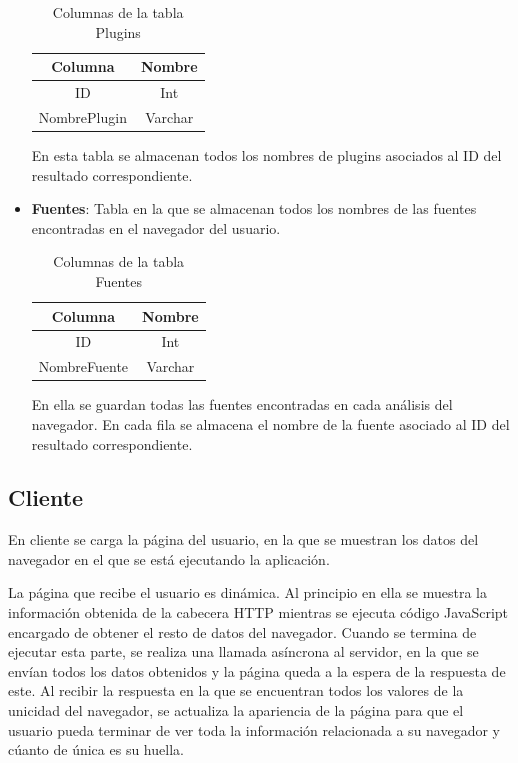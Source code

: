 \begin{itemize}
\begin{table}[H]
        \centering
        \begin{tabular}{c|c}
             Columna & Nombre \\ \hline
             ID & Int \\
             NombrePlugin & Varchar\\
        \end{tabular}
        \caption{Columnas de la tabla Plugins}
        \label{tab:plugins}
    \end{table}
    En esta tabla se almacenan todos los nombres de plugins asociados al ID del resultado correspondiente.
    \item \textbf{Fuentes}: Tabla en la que se almacenan todos los nombres de las fuentes encontradas en el navegador del usuario.
    \begin{table}[H]
        \centering
        \begin{tabular}{c|c}
             Columna & Nombre \\ \hline
             ID & Int \\
             NombreFuente & Varchar\\
        \end{tabular}
        \caption{Columnas de la tabla Fuentes}
        \label{tab:plugins}
    \end{table}
    En ella se guardan todas las fuentes encontradas en cada análisis del navegador. En cada fila se almacena el nombre de la fuente asociado al ID del resultado correspondiente.
\end{itemize}
\subsection{Cliente}
En cliente se carga la página del usuario, en la que se muestran los datos del navegador en el que se está ejecutando la aplicación.\par
La página que recibe el usuario es dinámica. Al principio en ella se muestra la información obtenida de la cabecera HTTP mientras se ejecuta código JavaScript encargado de obtener el resto de datos del navegador. Cuando se termina de ejecutar esta parte, se realiza una llamada asíncrona al servidor, en la que se envían todos los datos obtenidos y la página queda a la espera de la respuesta de este. Al recibir la respuesta en la que se encuentran todos los valores de la unicidad del navegador, se actualiza la apariencia de la página para que el usuario pueda terminar de ver toda la información relacionada a su navegador y cúanto de única es su huella. 

